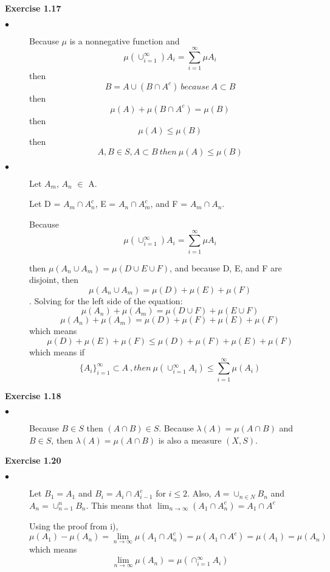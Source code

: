\documentclass[letterpaper,12pt]{article}
\theoremstyle{definition}
\begin{document}
\vspace{3mm}
\noindent\textbf{Exercise 1.17}
\begin{description}
  \item[$\bullet$] Because $\mu$ is a nonnegative function and \[\mu(\cup_{i=1}^\infty){A_i} =
  \sum_{i=1}^\infty \mu{A_i}\] then \[B = A \cup (B \cap A^c) \  because \  A \subset B \] then \[\mu (A) + \mu (B \cap A^c) = \mu (B) \] then \[\mu(A) \leq \mu(B) \] then \[ A, B \in S, A \subset B \ then \  \mu(A) \leq \mu(B)\]
  \item[$\bullet$] Let $A_m$, $A_n$ $\in$ A.
  
  Let D = $A_m \cap A_n^c$, E = $A_n \cap A_m^c$, and F = $A_m \cap A_n$.
  
  Because \[\mu(\cup_{i=1}^\infty){A_i} = \sum_{i=1}^\infty \mu{A_i}\]
  
  then $\mu(A_n \cup A_m) = \mu(D \cup E \cup F)$, and because D, E, and F are disjoint, then \[\mu(A_n \cup A_m) = \mu(D) + \mu(E) + \mu(F)\]. Solving for the left side of the equation: \[\mu(A_n) + \mu(A_m) = \mu(D \cup F) + \mu(E \cup F)\]
\[\mu(A_n) + \mu(A_m) = \mu(D) + \mu(F) + \mu(E) + \mu(F)\] which means
\[\mu(D) + \mu(E) + \mu(F) \leq \mu(D) + \mu(F) + \mu(E) + \mu(F)\] which means
  if \[\{A_i\}_{i=1}^\infty \subset A \ , then \ \mu(\cup_{i=1}^\infty A_i) \leq \sum_{i=1}^\infty \mu(A_i)\]
\end{description}

\vspace{3mm}
\noindent\textbf{Exercise 1.18}
\begin{description}
  \item[$\bullet$] Because $B \in S$ then $(A \cap B) \in S$. Because $\lambda(A) = \mu(A \cap B)$ and $B \in S$, then $\lambda(A) = \mu(A \cap B)$ is also a measure $(X,S)$.
  
\end{description}

\vspace{3mm}
\noindent\textbf{Exercise 1.20}
\begin{description}
  \item[$\bullet$] Let $B_1 = A_1$ and $B_i = A_i \cap A_{i-1}^c$ for $i \leq 2$. Also, $A = \cup_{n \in N} B_n$ and $A_n = \cup_{n = 1}^n B_n$. This means that $\lim_{n\to\infty} (A_1 \cap A_n^c) = A_1 \cap A^c $ 
  
  Using the proof from i), \[\mu(A_1) - \mu(A_n) = \lim_{n\to\infty} \mu(A_1 \cap A_n^c) = \mu(A_1 \cap A^c) = \mu(A_1) = \mu(A_n)\]
  which means 
  \[\lim_{n\to\infty} \mu(A_n) = \mu(\cap_{i=1}^\infty A_i)\]
\end{description}
\end{document}
